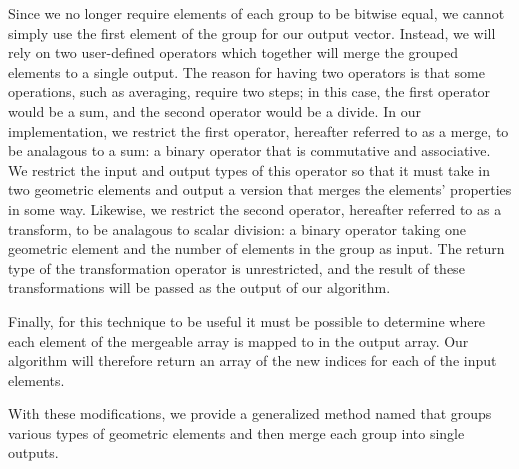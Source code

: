 \documentclass[review,journal]{vgtc}         %
\begin{document}
Since we no longer require elements of each group to be bitwise
equal, we cannot simply use the first element of the group for our output vector. Instead, we will rely on two user-defined operators
which together will merge the grouped elements to a single output. The reason for having two operators is that some operations, such
as averaging, require two steps; in this case, the first operator would be a sum, and the second operator would be a divide. In our
implementation, we restrict the first operator, hereafter referred to as a merge, to be analagous to a sum: a binary operator that is commutative and associative. We restrict the input and output types of this operator so that it must take in two geometric elements and output a version that merges the elements' properties in some way.
Likewise, we restrict the second operator, hereafter referred to as a transform, to be analagous to scalar division: a binary operator taking one geometric element and the number of elements in the
group as input. The return type of the transformation operator is unrestricted, and the result of these transformations will be passed as the output of our algorithm. 

Finally, for this technique to be useful it must be possible to determine where each element of the mergeable array is mapped to in the output array. 
Our algorithm will therefore return an array of the new indices for each of the input elements.


With these modifications, we provide a generalized method named  that groups various 
types of geometric elements and then merge each group into single outputs.
\end{document}
